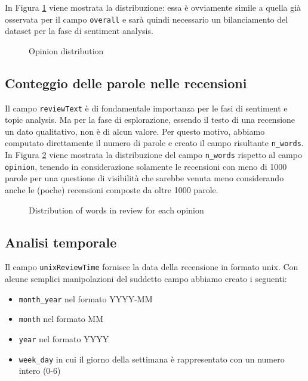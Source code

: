 In Figura \ref{opinion_distribution} viene mostrata la distribuzione: essa è ovviamente simile a quella già osservata per il campo \texttt{overall} e sarà quindi necessario un bilanciamento del dataset per la fase di sentiment analysis.

\begin{figure}[H]
  \centering
  
  \caption{Opinion distribution}
  \label{opinion_distribution}
\end{figure}

\subsection{Conteggio delle parole nelle recensioni}

Il campo \texttt{reviewText} è di fondamentale importanza per le fasi di sentiment e topic analysis. Ma per la fase di esplorazione, essendo il testo di una recensione un dato qualitativo, non è di alcun valore. Per questo motivo, abbiamo computato direttamente il numero di parole e creato il campo risultante \texttt{n\_words}. In Figura \ref{distribution_words_opinion} viene mostrata la distribuzione del campo \texttt{n\_words} rispetto al campo \texttt{opinion}, tenendo in considerazione solamente le recensioni con meno di 1000 parole per una questione di visibilità che sarebbe venuta meno considerando anche le (poche) recensioni composte da oltre 1000 parole.

\begin{figure}[H]
  \centering
  
  \caption{Distribution of words in review for each opinion}
  \label{distribution_words_opinion}
\end{figure}

\subsection{Analisi temporale}
Il campo \texttt{unixReviewTime} fornisce la data della recensione in formato unix. Con alcune semplici manipolazioni del suddetto campo abbiamo creato i seguenti:

\begin{itemize}
    \item \texttt{month\_year} nel formato YYYY-MM
    \item \texttt{month} nel formato MM
    \item \texttt{year} nel formato YYYY
    \item \texttt{week\_day} in cui il giorno della settimana è rappresentato con un numero intero (0-6) 
\end{itemize}{}

